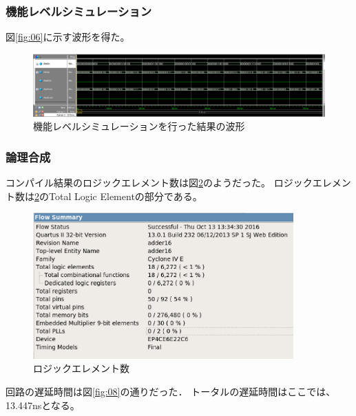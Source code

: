 \documentclass[uplatex]{jsarticle}
\begin{document}
\subsubsection{機能レベルシミュレーション}

図\ref{fig:06}に示す波形を得た。

\begin{figure}[htb]
  \begin{center}
    \includegraphics[width=13cm]{images/fig06.eps}
    \caption{機能レベルシミュレーションを行った結果の波形}
    \label{fig:09}
  \end{center}
\end{figure}

\subsubsection{論理合成}

コンパイル結果のロジックエレメント数は図\ref{fig:07}のようだった。
ロジックエレメント数は\ref{fig:07}のTotal Logic Elementの部分である。  

\begin{figure}[htb]
  \begin{center}
    \includegraphics[width=10cm]{images/fig07.eps}
    \caption{ロジックエレメント数}
    \label{fig:07}
  \end{center}
\end{figure}

回路の遅延時間は図\ref{fig:08}の通りだった．
トータルの遅延時間はここでは、13.447nsとなる。
\end{document}
